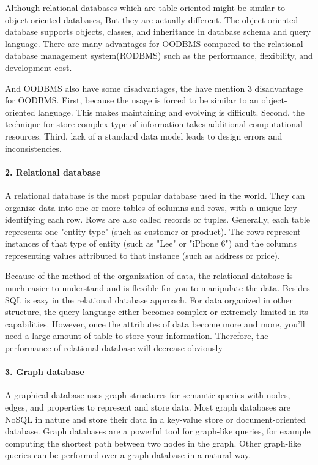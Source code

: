Although relational databases which are table-oriented might be similar to object-oriented databases, But they are actually different. The object-oriented database supports objects, classes, and inheritance in database schema and query language.
There are many advantages for OODBMS compared to the relational database management system(RODBMS) such as the performance, flexibility, and development cost.

And OODBMS also have some disadvantages, the \cite{Systems2010} have mention 3 disadvantage for OODBMS. First, because the usage is forced to be similar to an object-oriented language. This makes maintaining and evolving is difficult. Second, the technique for store complex type of information takes additional computational resources. Third, lack of a standard data model leads to design errors and inconsistencies.


\paragraph{2. Relational database}
A relational database is the most popular database used in the world. They can organize data into one or more tables of columns and rows, with a unique key identifying each row. Rows are also called records or tuples. Generally, each table represents one "entity type" (such as customer or product). The rows represent instances of that type of entity (such as "Lee" or "iPhone 6") and the columns representing values attributed to that instance (such as address or price).

Because of the method of the organization of data, the relational database is much easier to understand and is flexible for you to manipulate the data. Besides SQL is easy in the relational database approach. For data organized in other structure, the query language either becomes complex or extremely limited in its capabilities. However, once the attributes of data become more and more, you'll need a large amount of table to store your information. Therefore, the performance of relational database will decrease obviously


\paragraph{3. Graph database}
A graphical database uses graph structures for semantic queries with nodes, edges, and properties to represent and store data. Most graph databases are NoSQL in nature and store their data in a key-value store or document-oriented database. Graph databases are a powerful tool for graph-like queries, for example computing the shortest path between two nodes in the graph. Other graph-like queries can be performed over a graph database in a natural way.

